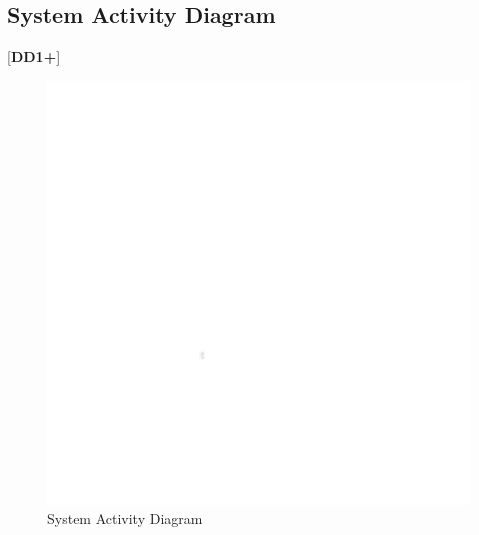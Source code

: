 \documentclass[letterpaper, 11pt]{article}
\begin{document}
\subsection{System Activity Diagram}
[\textbf{DD1+}]
\begin{figure}[h]
    \centering
    \includegraphics[width=16cm]{images/white.png} %
    \caption{System Activity Diagram}
\end{figure}

\clearpage
\end{document}
